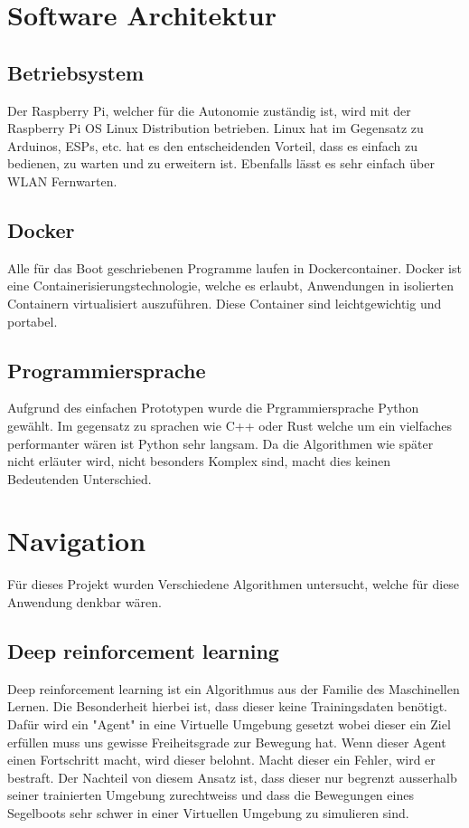 \section{Software Architektur}
\subsection*{Betriebsystem}
Der Raspberry Pi, welcher für die Autonomie zuständig ist, wird mit der Raspberry Pi OS Linux Distribution betrieben. Linux hat im Gegensatz zu Arduinos, ESPs, etc. hat es den entscheidenden Vorteil, dass es einfach zu bedienen, zu warten und zu erweitern ist. Ebenfalls lässt es sehr einfach über WLAN Fernwarten. 

\subsection*{Docker}
Alle für das Boot geschriebenen Programme laufen in Dockercontainer. Docker ist eine Containerisierungstechnologie, welche es erlaubt, Anwendungen in isolierten Containern virtualisiert auszuführen. Diese Container sind leichtgewichtig und portabel.

\subsection*{Programmiersprache}
Aufgrund des einfachen Prototypen wurde die Prgrammiersprache Python gewählt. Im gegensatz zu sprachen wie C++ oder Rust welche um ein vielfaches performanter wären ist Python sehr langsam. Da die Algorithmen wie später nicht erläuter wird, nicht besonders Komplex sind, macht dies keinen Bedeutenden Unterschied. 


\section{Navigation}
Für dieses Projekt wurden Verschiedene Algorithmen untersucht, welche für diese Anwendung denkbar wären.

\subsection{Deep reinforcement learning}
Deep reinforcement learning ist ein Algorithmus aus der Familie des Maschinellen Lernen. Die Besonderheit hierbei ist, dass dieser keine Trainingsdaten benötigt. Dafür wird ein "Agent" in eine Virtuelle Umgebung gesetzt wobei dieser ein Ziel erfüllen muss uns gewisse Freiheitsgrade zur Bewegung hat. Wenn dieser Agent einen Fortschritt macht, wird dieser belohnt. Macht dieser ein Fehler, wird er bestraft. 
Der Nachteil von diesem Ansatz ist, dass dieser nur begrenzt ausserhalb seiner trainierten Umgebung zurechtweiss und dass die Bewegungen eines Segelboots sehr schwer in einer Virtuellen Umgebung zu simulieren sind.

